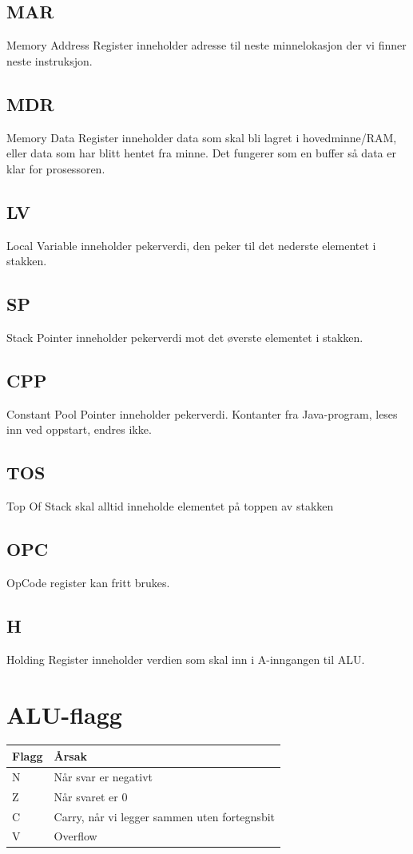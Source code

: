 \documentclass[a4paper, 10pt]{article}
\begin{document}
\subsection{MAR}
Memory Address Register inneholder adresse til neste minnelokasjon der vi finner neste instruksjon.

\subsection{MDR}
Memory Data Register inneholder data som skal bli lagret i hovedminne/RAM, eller data som har blitt hentet fra minne. Det fungerer som en buffer så data er klar for prosessoren.

\subsection{LV}
Local Variable inneholder pekerverdi, den peker til det nederste elementet i stakken.

\subsection{SP}
Stack Pointer inneholder pekerverdi mot det øverste elementet i stakken.

\subsection{CPP}
Constant Pool Pointer inneholder pekerverdi. Kontanter fra Java-program, leses inn ved oppstart, endres ikke.

\subsection{TOS}
Top Of Stack skal alltid inneholde elementet på toppen av stakken

\subsection{OPC}
OpCode register kan fritt brukes.

\subsection{H}
Holding Register inneholder verdien som skal inn i A-inngangen til ALU.

\section{ALU-flagg}
\begin{tabular}{|l|l|}
    \hline
    Flagg & Årsak                                        \\ \hline
    N     & Når svar er negativt                         \\ \hline
    Z     & Når svaret er 0                              \\ \hline
    C     & Carry, når vi legger sammen uten fortegnsbit \\ \hline
    V     & Overflow                                     \\ \hline
\end{tabular}
\end{document}
